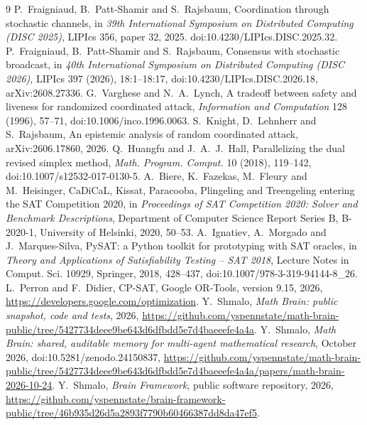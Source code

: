 \documentclass[11pt]{article}
\theoremstyle{remark}
\begin{document}
\begin{thebibliography}{9}
 P.~Fraigniaud, B.~Patt-Shamir and S.~Rajsbaum, Coordination through stochastic channels, in \emph{39th International Symposium on Distributed Computing (DISC 2025)}, LIPIcs 356, paper 32, 2025. doi:10.4230/LIPIcs.DISC.2025.32.
 P.~Fraigniaud, B.~Patt-Shamir and S.~Rajsbaum, Consensus with stochastic broadcast, in \emph{40th International Symposium on Distributed Computing (DISC 2026)}, LIPIcs 397 (2026), 18:1--18:17, doi:10.4230/LIPIcs.DISC.2026.18, arXiv:2608.27336.
 G.~Varghese and N.~A.~Lynch, A tradeoff between safety and liveness for randomized coordinated attack, \emph{Information and Computation} 128 (1996), 57--71, doi:10.1006/inco.1996.0063.
 S.~Knight, D.~Lehnherr and S.~Rajsbaum, An epistemic analysis of random coordinated attack, arXiv:2606.17860, 2026.
 Q.~Huangfu and J.~A.~J.~Hall, Parallelizing the dual revised simplex method, \emph{Math. Program. Comput.} 10 (2018), 119--142, doi:10.1007/s12532-017-0130-5.
 A.~Biere, K.~Fazekas, M.~Fleury and M.~Heisinger, CaDiCaL, Kissat, Paracooba, Plingeling and Treengeling entering the SAT Competition 2020, in \emph{Proceedings of SAT Competition 2020: Solver and Benchmark Descriptions}, Department of Computer Science Report Series B, B-2020-1, University of Helsinki, 2020, 50--53.
 A.~Ignatiev, A.~Morgado and J.~Marques-Silva, PySAT: a Python toolkit for prototyping with SAT oracles, in \emph{Theory and Applications of Satisfiability Testing -- SAT 2018}, Lecture Notes in Comput. Sci. 10929, Springer, 2018, 428--437, doi:10.1007/978-3-319-94144-8\_26.
 L.~Perron and F.~Didier, CP-SAT, Google OR-Tools, version 9.15, 2026, \url{https://developers.google.com/optimization}.
 Y.~Shmalo, \emph{Math Brain: public snapshot, code and tests}, 2026, \url{https://github.com/yspennstate/math-brain-public/tree/5427734deee9be643d6dfbdd5e7d4baeeefe4a4a}.
 Y.~Shmalo, \emph{Math Brain: shared, auditable memory for multi-agent mathematical research}, October 2026, doi:10.5281/zenodo.24150837, \url{https://github.com/yspennstate/math-brain-public/tree/5427734deee9be643d6dfbdd5e7d4baeeefe4a4a/papers/math-brain-2026-10-24}.
 Y.~Shmalo, \emph{Brain Framework}, public software repository, 2026, \url{https://github.com/yspennstate/brain-framework-public/tree/46b935d26d5a2893f7790b60466387dd8da47ef5}.
\end{thebibliography}
\end{document}
